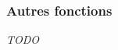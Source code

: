 \documentclass{beamer}
\begin{document}

\begin{frame}
\frametitle{Autres fonctions}
\begin{center}
\emph{TODO}
\end{center}
\end{frame}





\end{document}
